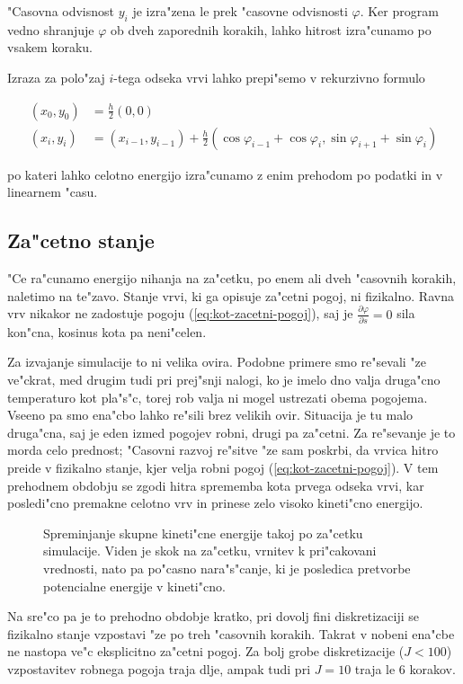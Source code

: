 \documentclass[a4paper,10pt]{article}
\renewcommand{\phi}{\varphi}
\newcommand{\parcialno}[2]{
  \frac{\partial #1}{\partial #2}
}
\begin{document}
"Casovna odvisnost $y_i$ je izra"zena le prek "casovne odvisnosti $\phi$. Ker program vedno shranjuje $\phi$ ob dveh zaporednih korakih, lahko hitrost izra"cunamo po vsakem koraku. 

Izraza za polo"zaj $i$-tega odseka vrvi lahko prepi"semo v rekurzivno formulo

\begin{align}
 (x_0, y_0) &= \frac{h}{2}(0, 0) \\
 (x_i, y_i) &= (x_{i-1}, y_{i-1}) + \frac{h}{2} (\cos\phi_{i-1} + \cos\phi_i, \sin\phi_{i+1} + \sin\phi_i)
\end{align}

po kateri lahko celotno energijo izra"cunamo z enim prehodom po podatki in v linearnem "casu. 

\subsection{Za"cetno stanje}

"Ce ra"cunamo energijo nihanja na za"cetku, po enem ali dveh "casovnih korakih, naletimo na te"zavo. Stanje vrvi, ki ga opisuje za"cetni pogoj, ni fizikalno. Ravna vrv nikakor ne zadostuje pogoju (\ref{eq:kot-zacetni-pogoj}), saj je $\parcialno{\phi}{s}=0$ sila kon"cna, kosinus kota pa neni"celen. 

Za izvajanje simulacije to ni velika ovira. Podobne primere smo re"sevali "ze ve"ckrat, med drugim tudi pri prej"snji nalogi, ko je imelo dno valja druga"cno temperaturo kot pla"s"c, torej rob valja ni mogel ustrezati obema pogojema. Vseeno pa smo ena"cbo lahko re"sili brez velikih ovir. Situacija je tu malo druga"cna, saj je eden izmed pogojev robni, drugi pa za"cetni. Za re"sevanje je to morda celo prednost; "Casovni razvoj re"sitve "ze sam poskrbi, da vrvica hitro preide v fizikalno stanje, kjer velja robni pogoj (\ref{eq:kot-zacetni-pogoj}). V tem prehodnem obdobju se zgodi hitra sprememba kota prvega odseka vrvi, kar posledi"cno premakne celotno vrv in prinese zelo visoko kineti"cno energijo. 

\begin{figure}[H]
 
 \caption{Spreminjanje skupne kineti"cne energije takoj po za"cetku simulacije. Viden je skok na za"cetku, vrnitev k pri"cakovani vrednosti, nato pa po"casno nara"s"canje, ki je posledica pretvorbe potencialne energije v kineti"cno. }
 \label{fig:energija-zacetek}
\end{figure}

Na sre"co pa je to prehodno obdobje kratko, pri dovolj fini diskretizaciji se fizikalno stanje vzpostavi "ze po treh "casovnih korakih. Takrat v nobeni ena"cbe ne nastopa ve"c eksplicitno za"cetni pogoj. Za bolj grobe diskretizacije ($J < 100$) vzpostavitev robnega pogoja traja dlje, ampak tudi pri $J=10$ traja le 6 korakov. 
\end{document}
